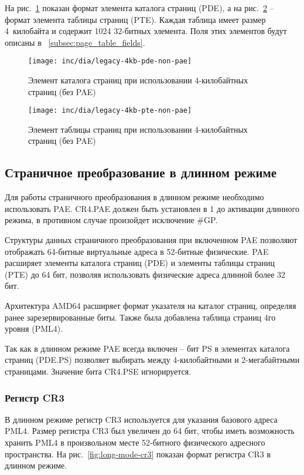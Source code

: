 На рис.~\ref{fig:legacy-4kb-pde-non-pae} показан формат элемента каталога страниц (PDE),
а на рис.~\ref{fig:legacy-4kb-pte-non-pae} -- формат элемента таблицы страниц (PTE).
Каждая таблица имеет размер 4~килобайта и содержит 1024 32-битных элемента. Поля этих элементов
будут описаны в ~\ref{subsec:page_table_fields}.

\begin{figure}[ht]
  \centering
  \texttt{[image: inc/dia/legacy-4kb-pde-non-pae]}
  \caption{Элемент каталога страниц при использовании 4-килобайтных страниц (без PAE)}
  \label{fig:legacy-4kb-pde-non-pae}
\end{figure}

\begin{figure}[ht]
  \centering
  \texttt{[image: inc/dia/legacy-4kb-pte-non-pae]}
  \caption{Элемент таблицы страниц при использовании 4-килобайтных страниц (без PAE)}
  \label{fig:legacy-4kb-pte-non-pae}
\end{figure}

\subsection{Страничное преобразование в длинном режиме}
Для работы страничного преобразования в длинном режиме необходимо использовать PAE.
CR4.PAE должен быть установлен в 1 до активации длинного режима, в противном случае
произойдет исключение \#GP.

Структуры данных страничного преобразования при включенном PAE позволяют отображать 64-битные
виртуальные адреса в 52-битные физические. PAE расширяет элементы каталога страниц (PDE) и
элементы таблицы страниц (PTE) до 64 бит, позволяя использовать физические адреса длинной более 32 бит.

Архитектура AMD64 расширяет формат указателя на каталог страниц, определяя ранее зарезервированные биты.
Также была добавлена таблица страниц 4го уровня (PML4).

Так как в длинном режиме PAE всегда включен -- бит PS в элементах каталога страниц (PDE.PS)
позволяет выбирать между 4-килобайтными и 2-мегабайтными страницами. Значение бита CR4.PSE игнорируется.

\subsubsection*{Регистр CR3}
В длинном режиме регистр CR3 используется для указания базового адреса PML4. Размер регистра CR3 был
увеличен до 64 бит, чтобы иметь возможность хранить PML4 в произвольном месте 52-битного физического
адресного пространства. На рис.~\ref{fig:long-mode-cr3} показан формат регистра CR3 в длинном режиме.

